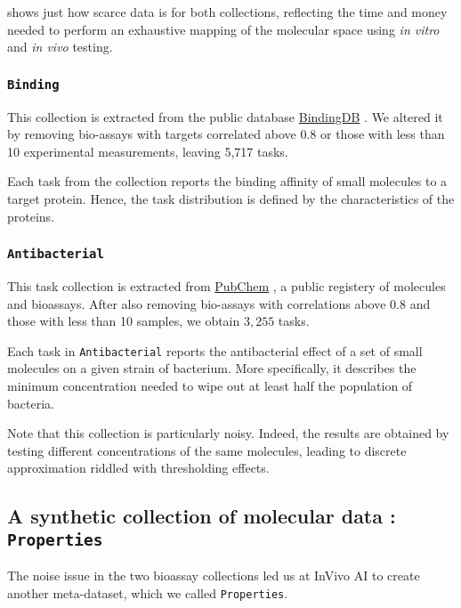  shows just how scarce data is for both collections, reflecting the time and money needed to perform an exhaustive mapping of the molecular space using \textit{in vitro} and \textit{in vivo} testing.

\subsubsection{\texttt{Binding}}
\label{app:collections-binding}

This collection is extracted from the public database \href{www.bindingdb.org}{BindingDB} \citep{liu2007bindingdb}. We altered it by removing bio-assays with targets correlated above $0.8$ or those with less than 10 experimental measurements, leaving 5,717 tasks.

Each task from the collection reports the binding affinity of small molecules to a target protein. Hence, the task distribution is defined by the characteristics of the proteins.

\subsubsection{\texttt{Antibacterial}}
\label{app:collections-antibacterial}

This task collection is extracted from \href{https://pubchem.ncbi.nlm.nih.gov/}{PubChem} \citep{kim2019pubchem}, a public registery of molecules and bioassays. After also removing bio-assays with correlations above $0.8$ and those with less than 10 samples, we obtain $3,255$ tasks.

Each task in \texttt{Antibacterial} reports the antibacterial effect of a set of small molecules on a given strain of bacterium. More specifically, it describes the minimum concentration needed to wipe out at least half the population of bacteria.

Note that this collection is particularly noisy. Indeed, the results are obtained by testing different concentrations of the same molecules, leading to discrete approximation riddled with thresholding effects.


\subsection{A synthetic collection of molecular data : \texttt{Properties}}
\label{app:collections-properties}

The noise issue in the two bioassay collections led us at InVivo AI to create another meta-dataset, which we called \texttt{Properties}.

